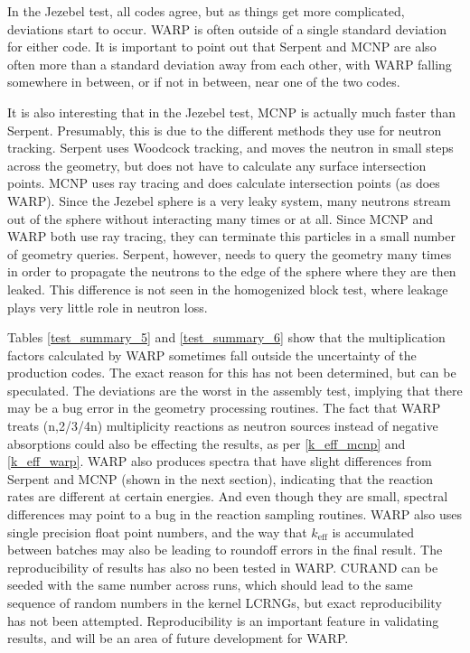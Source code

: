 In the Jezebel test, all codes agree, but as things get more complicated, deviations start to occur.  WARP is often outside of a single standard deviation for either code.  It is important to point out that Serpent and MCNP are also often more than a standard deviation away from each other, with WARP falling somewhere in between, or if not in between, near one of the two codes.

It is also interesting that in the Jezebel test, MCNP is actually much faster than Serpent.  Presumably, this is due to the different methods they use for neutron tracking.  Serpent uses Woodcock tracking, and moves the neutron in small steps across the geometry, but does not have to calculate any surface intersection points.  MCNP uses ray tracing and does calculate intersection points (as does WARP).  Since the Jezebel sphere is a very leaky system, many neutrons stream out of the sphere without interacting many times or at all.  Since  MCNP and WARP both use ray tracing, they can terminate this particles in a small number of geometry queries.  Serpent, however, needs to query the geometry many times in order to propagate the neutrons to the edge of the sphere where they are then leaked.  This difference is not seen in the homogenized block test, where leakage plays very little role in neutron loss.

Tables \ref{test_summary_5} and \ref{test_summary_6} show that the multiplication factors calculated by WARP sometimes fall outside the uncertainty of the production codes.  The exact reason for this has not been determined, but can be speculated.  The deviations are the worst in the assembly test, implying that there may be a bug error in the geometry processing routines.  The fact that WARP treats (n,2/3/4n) multiplicity reactions as neutron sources instead of negative absorptions could also be effecting the results, as per \eqref{k_eff_mcnp} and \eqref{k_eff_warp}.  WARP also produces spectra that have slight differences from Serpent and MCNP (shown in the next section), indicating that the reaction rates are different at certain energies.  And even though they are small, spectral differences may point to a bug in the reaction sampling routines.  WARP also uses single precision float point numbers, and the way that $k_\mathrm{eff}$ is accumulated between batches may also be leading to roundoff errors in the final result.  The reproducibility of results has also no been tested in WARP.  CURAND can be seeded with the same number across runs, which should lead to the same sequence of random numbers in the kernel LCRNGs, but exact reproducibility has not been attempted.  Reproducibility is an important feature in validating results, and will be an area of future development for WARP.

